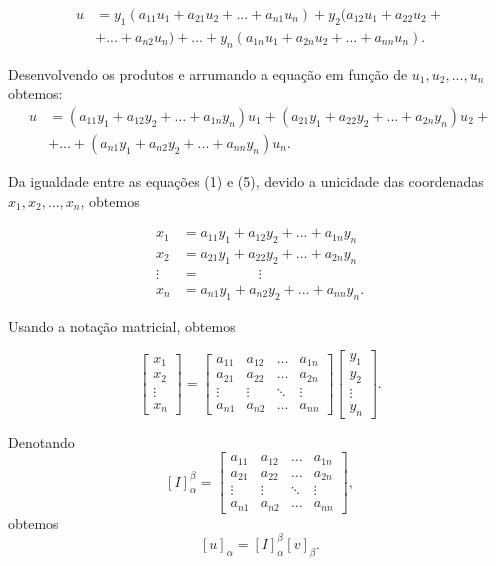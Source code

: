 \begin{align}
u&=y_1(a_{11}u_1+ a_{21}u_2+ ...+a_{n1}u_n )+ y_2(a_{12}u_1+ a_{22}u_2+ \nonumber \\
    &+ ...+a_{n2}u_n )+ ...+y_n(a_{1n}u_1+ a_{2n}u_2+ ...+a_{nn}u_n).
\end{align}\label{eq4}

Desenvolvendo os produtos e arrumando a equação  em função de $u_1, u_2,..., u_n$ obtemos:
\begin{align}
u&=(a_{11}y_1+a_{12}y_2+...+a_{1n}y_n)u_1+(a_{21}y_1+a_{22}y_2+...+a_{2n}y_n)u_2+ \nonumber\\
&+...+ (a_{n1}y_1+a_{n2}y_2+...+a_{nn}y_n)u_n.
\end{align}\label{eq5}

Da igualdade entre as equações (1) e (5), devido a unicidade das coordenadas $x_1, x_2, ...,x_n$, obtemos


\begin{align}
x_1&=a_{11}y_1+a_{12}y_2+...+a_{1n}y_n  \nonumber \\
x_2&=a_{21}y_1+a_{22}y_2+...+a_{2n}y_n \nonumber \\
\vdots&=\; \;\;  \; \;\; \; \;\;\; \;\;\; \;\; \vdots \\
x_n&=a_{n1}y_1+a_{n2}y_2+...+a_{nn}y_n. \nonumber
\end{align}\label{eq6}

Usando a notação matricial, obtemos

$$\left[ \begin{array}{c}x_1 \\x_2 \\ \vdots \\ x_n\end{array}\right ]=\left[ \begin{array}{cccc}a_{11}& a_{12} & \hdots & a_{1n}\\a_{21}& a_{22} & \hdots & a_{2n} \\ \vdots & \vdots& \ddots& \vdots\\  a_{n1}& a_{n2} & \hdots & a_{nn}\end{array}\right ] \left[ \begin{array}{c}y_1 \\y_2 \\ \vdots \\ y_n\end{array}\right ].$$


Denotando  $$[I]_{\alpha}^{\beta}=\left[ \begin{array}{cccc}a_{11}& a_{12} & \hdots & a_{1n}\\a_{21}& a_{22} & \hdots & a_{2n} \\ \vdots & \vdots& \ddots& \vdots\\  a_{n1}& a_{n2} & \hdots & a_{nn}\end{array}\right ],$$ obtemos $$[u]_{\alpha}= [I]_{\alpha}^{\beta}[v]_{\beta}.$$


